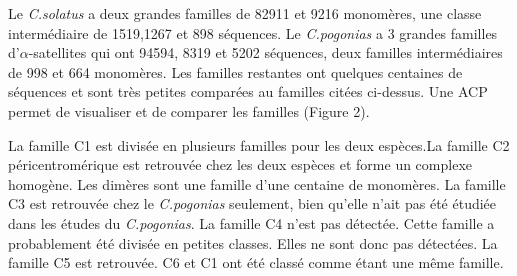\documentclass[12pt,a4paper]{article}
\begin{document}
Le \textit{C.solatus} a deux grandes familles de 82911 et 9216 monomères, une classe intermédiaire de 1519,1267 et 898 séquences. Le \textit{C.pogonias} a 3 grandes familles d'$\alpha$-satellites qui ont 94594, 8319 et 5202 séquences, deux familles intermédiaires de 998 et 664 monomères. Les familles restantes ont quelques centaines de séquences et sont très petites comparées au familles citées ci-dessus. Une ACP permet de visualiser et de comparer les familles (Figure 2). 

La famille C1 est divisée en plusieurs familles pour les deux espèces.La famille C2 péricentromérique est retrouvée chez les deux espèces et forme un complexe homogène. Les dimères sont une famille d'une centaine de monomères. La famille C3 est retrouvée chez le \textit{C.pogonias} seulement, bien qu'elle n'ait pas été étudiée dans les études du \textit{C.pogonias}. La famille C4 n'est pas détectée. Cette famille a probablement été divisée en petites classes. Elles ne sont donc pas détectées. La famille C5 est retrouvée. C6 et C1 ont été classé comme étant une même famille. 

\end{document}
